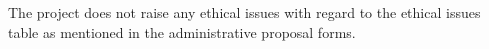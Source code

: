 The \Project{} project does not raise any ethical issues with regard to the ethical issues table as mentioned in the administrative proposal forms.
